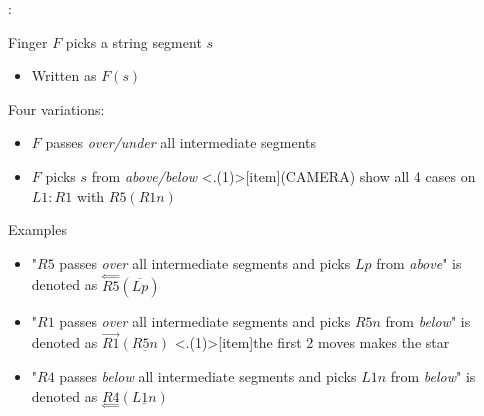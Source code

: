\begin{frame}{\secname: \subsecname}

Finger $F$ picks a string segment $s$ 

\begin{itemize}
    \item Written as $F(s)$
\end{itemize}

\pause Four variations:
\begin{itemize}[<+(1)->]
    \item $F$ passes \emph{over/under} all intermediate segments
    \item $F$ picks $s$ from \emph{above/below}
    \note<.(1)>[item]{(CAMERA) show all 4 cases on $L1:R1$ with $R5(R1n)$}
\end{itemize}

\pause Examples
\begin{itemize}[<+(1)->]
    \item "$R5$ passes \emph{over} all intermediate segments and picks $Lp$ from \emph{above}" is denoted  as $\overset\Longleftarrow{R5}(\overline{Lp})$
    \item "$R1$ passes \emph{over} all intermediate segments and picks $R5n$ from \emph{below}" is denoted as $\overrightarrow{R1}(\underline{R5n})$
    \note<.(1)>[item]{the first 2 moves makes the star}
    \item "$R4$ passes \emph{below} all intermediate segments and picks $L1n$ from \emph{below}" is denoted as $\underset\Longleftarrow{R4}(\underline{L1n})$
\end{itemize}
\end{frame}

